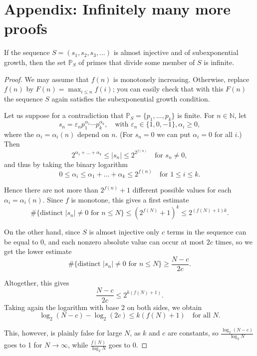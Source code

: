 \section{Appendix: Infinitely many more proofs} \label{appendix:more_primes}
\begin{theorem}
    \label{thm:infty_proof}
    \leanok
    If the sequence \(S = (s_1, s_2, s_3, \dots)\) is almost injective and of subexponential growth,
    then the set \(\mathbb{P}_S\) of primes that divide some member of $S$ is infinite.
\end{theorem}
\begin{proof}
	We may assume that \(f(n)\) is monotonely increasing. Otherwise, replace \(f(n)\) by \(F(n) = \max_{i \leq n} f(i)\); you can easily check that with this \(F(n)\) the sequence \(S\) again satisfies the subexponential growth condition.
	
	Let us suppose for a contradiction that \(\mathbb{P}_S = \{p_1, \dots, p_k\}\) is finite. For \(n \in \mathbb{N}\), let
	\[
	s_n = \varepsilon_n p_1^{\alpha_1} \cdots p_k^{\alpha_k}, \quad \text{with } \varepsilon_n \in \{1, 0, -1\}, \alpha_i \ge 0,
	\]
	where the \(\alpha_i = \alpha_i(n)\) depend on \(n\). (For \(s_n = 0\) we can put \(\alpha_i = 0\) for all \(i\).) Then
	\[
	2^{\alpha_1 + \dots + \alpha_k} \leq |s_n| \leq 2^{2^{f(n)}} \quad \text{for } s_n \ne 0,
	\]
	and thus by taking the binary logarithm
	\[
	0 \leq \alpha_i \leq \alpha_1 + \dots + \alpha_k \leq 2^{f(n)} \quad \text{for } 1 \leq i \leq k.
	\]
	
	Hence there are not more than \(2^{f(n)} + 1\) different possible values for each \(\alpha_i = \alpha_i(n)\). Since \(f\) is monotone, this gives a first estimate
	\[
	\#\{\text{distinct } |s_n| \ne 0 \text{ for } n \leq N\} \leq (2^{f(N)} + 1)^k \leq 2^{(f(N)+1)k}.
	\]
	
	On the other hand, since \(S\) is almost injective only \(c\) terms in the sequence can be equal to 0, and each nonzero absolute value can occur at most \(2c\) times, so we get the lower estimate
	\[
	\#\{\text{distinct } |s_n| \ne 0 \text{ for } n \leq N\} \ge \frac{N-c}{2c}.
	\]
	
	Altogether, this gives
	\[
	\frac{N-c}{2c} \leq 2^{k(f(N)+1)}.
	\]
	Taking again the logarithm with base 2 on both sides, we obtain
	\[
	\log_2(N-c) - \log_2(2c) \leq k(f(N)+1) \quad \text{for all } N.
	\]
	
	This, however, is plainly false for large \(N\), as \(k\) and \(c\) are constants, so \(\frac{\log_2(N-c)}{\log_2 N}\) goes to 1 for \(N \to \infty\), while \(\frac{f(N)}{\log_2 N}\) goes to 0.
\end{proof}

